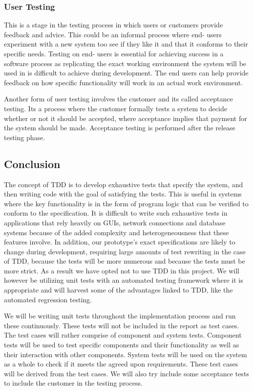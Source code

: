 \subsubsection{User Testing}
This is a stage in the testing process in which users or customers provide feedback and advice. This could be an informal process where end- users experiment with a new system too see if they like it and that it conforms to their specific needs. Testing on end- users is essential for achieving success in a software process as replicating the exact working environment the system will be used in is difficult to achieve during development. The end users can help provide feedback on how specific functionality will work in an actual work environment.

Another form of user testing involves the customer and its called acceptance testing. Its a process where the customer formally tests a system to decide whether or not it should be accepted, where acceptance implies that payment for the system should be made. Acceptance testing is performed after the release testing phase.

\subsection{Conclusion}
The concept of TDD is to develop exhaustive tests that specify the system, and then writing code with the goal of satisfying the tests. This is useful in systems where the key functionality is in the form of program logic that can be verified to conform to the specification. It is difficult to write such exhaustive tests in applications that rely heavily on GUIs, network connections and database systems because of the added complexity and heterogeneousness that these features involve. In addition, our prototype's exact specifications are likely to change during development, requiring large amounts of test rewriting in the case of TDD, because the tests will be more numerous and because the tests must be more strict. As a result we have opted not to use TDD in this project. We will however be utilizing unit tests with an automated testing framework where it is appropriate and will harvest some of the advantages linked to TDD, like the automated regression testing.

We will be writing unit tests throughout the implementation process and run these continuously. These tests will not be included in the report as test cases. The test cases will rather comprise of component and system tests. Component tests will be used to test specific components and their functionality as well as their interaction with other components. System tests will be used on the system as a whole to check if it meets the agreed upon requirements. These test cases will be derived from the test cases. We will also try include some acceptance tests to include the customer in the testing process. 


